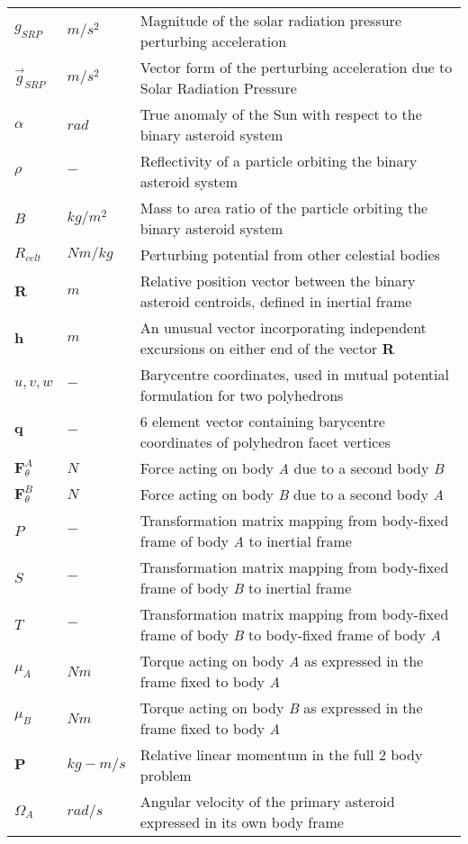 \begin{longtable}[l]{p{100pt} p{70pt} p{250pt}}
$g_{SRP}$		& $m/s^2$	& Magnitude of the solar radiation pressure perturbing acceleration\\
$\overrightarrow{g}_{SRP}$		& $m/s^2$		& Vector form of the perturbing acceleration due to Solar Radiation Pressure\\
$\alpha$ 	& $rad$ 	& True anomaly of the Sun with respect to the binary asteroid system\\
$\rho$		& $-$		& Reflectivity of a particle orbiting the binary asteroid system\\
$B$		& $kg/m^2$		& Mass to area ratio of the particle orbiting the binary asteroid system\\
$R_{celt}$		& $Nm/kg$	& Perturbing potential from other celestial bodies\\
$\mathbf{R}$ 	& $m$		& Relative position vector between the binary asteroid centroids, defined in inertial frame\\
$\mathbf{h}$	& $m$		& An unusual vector incorporating independent excursions on either end of the vector \textbf{R}\\
$u,v,w$		& $-$		& Barycentre coordinates, used in mutual potential formulation for two polyhedrons	\\
$\mathbf{q}$		& $-$		& 6 element vector containing barycentre coordinates of polyhedron facet vertices\\
$\mathbf{F}_\theta^A$	& $N$	& Force acting on body \textit{A} due to a second body \textit{B}\\
$\mathbf{F}_\theta^B$	& $N$	& Force acting on body \textit{B} due to a second body \textit{A}\\ 
$P$	& $-$	& Transformation matrix mapping from body-fixed frame of body \textit{A} to inertial frame\\
$S$	& $-$	& Transformation matrix mapping from body-fixed frame of body \textit{B} to inertial frame\\
$T$	& $-$	& Transformation matrix mapping from body-fixed frame of body \textit{B} to body-fixed frame of body \textit{A}\\
$\mu_A$	& $Nm$	& Torque acting on body \textit{A} as expressed in the frame fixed to body \textit{A}\\
$\mu_B$	& $Nm$	& Torque acting on body \textit{B} as expressed in the frame fixed to body \textit{A}\\
$\mathbf{P}$	& $kg-m/s$	& Relative linear momentum in the full 2 body problem\\
$\Omega_A$		& $rad/s$	& Angular velocity of the primary asteroid expressed in its own body frame\\

\end{longtable}
